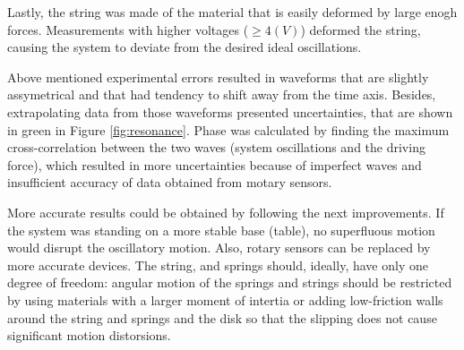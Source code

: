 Lastly, the string was made of the material that is easily deformed by large enogh forces. Measurements with higher voltages ($\ge 4 (V)$) deformed the string, causing the system to deviate from the desired ideal oscillations.

Above mentioned experimental errors resulted in waveforms that are slightly assymetrical and that had tendency to shift away from the time axis. Besides, extrapolating data from those waveforms presented uncertainties, that are shown in green in Figure \ref{fig:resonance}. Phase was calculated by finding the maximum cross-correlation between the two waves (system oscillations and the driving force), which resulted in more uncertainties because of imperfect waves and insufficient accuracy of data obtained from motary sensors.

More accurate results could be obtained by following the next improvements. If the system was standing on a more stable base (table), no superfluous motion would disrupt the oscillatory motion. Also, rotary sensors can be replaced by more accurate devices. The string, and springs should, ideally, have only one degree of freedom: angular motion of the springs and strings should be restricted by using materials with a larger moment of intertia or adding low-friction walls around the string and springs and the disk so that the slipping does not cause significant motion distorsions.
